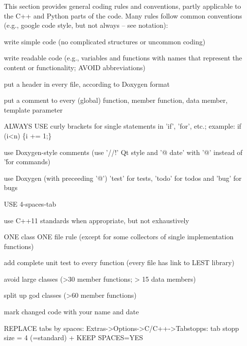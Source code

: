 %
This section provides general coding rules and conventions, partly applicable to the C++ and Python parts of the code. Many rules follow common conventions (e.g., google code style, but not always -- see notation):
\bi
    \item write simple code (no complicated structures or uncommon coding)
    \item write readable code (e.g., variables and functions with names that represent the content or functionality; AVOID abbreviations)
    \item put a header in every file, according to Doxygen format
    \item put a comment to every (global) function, member function, data member, template parameter
    \item ALWAYS USE curly brackets for single statements in 'if', 'for', etc.; example: if (i<n) \{i += 1;\}
    \item use Doxygen-style comments (use '//!' Qt style and '@ date' with '@' instead of '\' for commands)
    \item use Doxygen (with preceeding '@') 'test' for tests, 'todo' for todos and 'bug' for bugs
    \item USE 4-spaces-tab
    \item use C++11 standards when appropriate, but not exhaustively
    \item ONE class ONE file rule (except for some collectors of single implementation functions)
    \item add complete unit test to every function (every file has link to LEST library)
    \item avoid large classes (>30 member functions; > 15 data members)
    \item split up god classes (>60 member functions)
    \item mark changed code with your name and date
    \item REPLACE tabs by spaces: Extras->Options->C/C++->Tabstopps: tab stopp size = 4 (=standard) +  KEEP SPACES=YES
\ei

